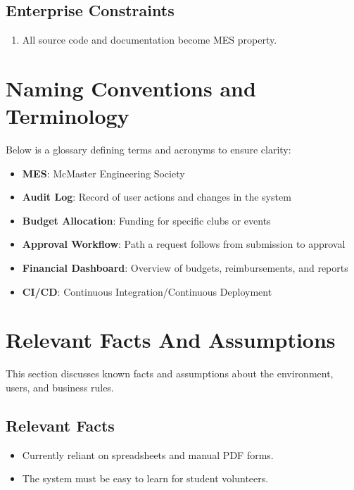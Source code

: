 \documentclass[12pt]{article}
\begin{document}
\subsection{Enterprise Constraints}
\begin{enumerate}
  \item All source code and documentation become MES property.
\end{enumerate}

\section{Naming Conventions and Terminology}
Below is a glossary defining terms and acronyms to ensure clarity:

\begin{itemize}
    \item \textbf{MES}: McMaster Engineering Society
    \item \textbf{Audit Log}: Record of user actions and changes in the system
    \item \textbf{Budget Allocation}: Funding for specific clubs or events
    \item \textbf{Approval Workflow}: Path a request follows from submission to approval
    \item \textbf{Financial Dashboard}: Overview of budgets, reimbursements, and reports
    \item \textbf{CI/CD}: Continuous Integration/Continuous Deployment
\end{itemize}

\section{Relevant Facts And Assumptions}
This section discusses known facts and assumptions about the environment, users, and business rules.

\subsection{Relevant Facts}
\begin{itemize}
  \item Currently reliant on spreadsheets and manual PDF forms.
  \item The system must be easy to learn for student volunteers.
\end{itemize}
\end{document}
